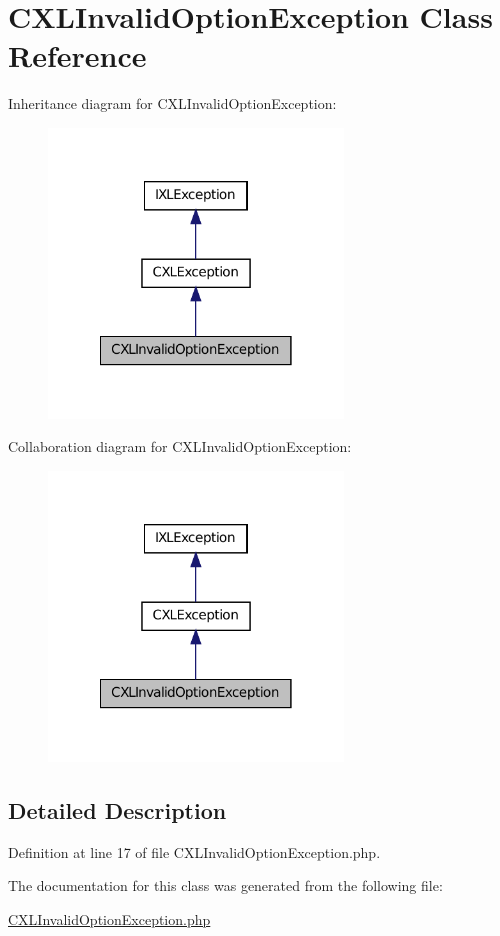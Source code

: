 \hypertarget{classCXLInvalidOptionException}{
\section{CXLInvalidOptionException Class Reference}
\label{classCXLInvalidOptionException}
}


Inheritance diagram for CXLInvalidOptionException:\nopagebreak
\begin{figure}[H]
\begin{center}
\leavevmode
\includegraphics[width=222pt]{classCXLInvalidOptionException__inherit__graph}
\end{center}
\end{figure}


Collaboration diagram for CXLInvalidOptionException:\nopagebreak
\begin{figure}[H]
\begin{center}
\leavevmode
\includegraphics[width=222pt]{classCXLInvalidOptionException__coll__graph}
\end{center}
\end{figure}


\subsection{Detailed Description}


Definition at line 17 of file CXLInvalidOptionException.php.



The documentation for this class was generated from the following file:\begin{DoxyCompactItemize}
\item 
\hyperlink{CXLInvalidOptionException_8php}{CXLInvalidOptionException.php}\end{DoxyCompactItemize}
